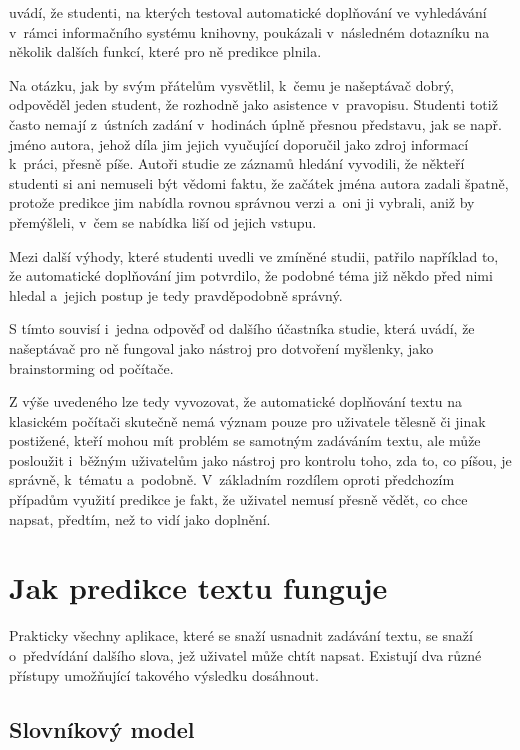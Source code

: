 \documentclass[a4paper,11pt,openany]{book} %
\begin{document}
\parencite{ward2012autocomplete} uvádí, že studenti, na kterých testoval automatické doplňování ve vyhledávání v~rámci informačního systému knihovny, poukázali v~následném dotazníku na několik dalších funkcí, které pro ně predikce plnila.

Na otázku, jak by svým přátelům vysvětlil, k~čemu je našeptávač dobrý, odpověděl jeden student, že rozhodně jako asistence v~pravopisu. Studenti totiž často nemají z~ústních zadání v~hodinách úplně přesnou představu, jak se např. jméno autora, jehož díla jim jejich vyučující doporučil jako zdroj informací k~práci, přesně píše. Autoři studie ze záznamů hledání vyvodili, že někteří studenti si ani nemuseli být vědomi faktu, že začátek jména autora zadali špatně, protože predikce jim nabídla rovnou správnou verzi a~oni ji vybrali, aniž by přemýšleli, v~čem se nabídka liší od jejich vstupu. 

Mezi další výhody, které studenti uvedli ve zmíněné studii, patřilo například to, že automatické doplňování jim potvrdilo, že podobné téma již někdo před nimi hledal a~jejich postup je tedy pravděpodobně správný. 

S tímto souvisí i~jedna odpověď od dalšího účastníka studie, která uvádí, že našeptávač pro ně fungoval jako nástroj pro dotvoření myšlenky, jako brainstorming od počítače. 

Z výše uvedeného lze tedy vyvozovat, že automatické doplňování textu na klasickém počítači skutečně nemá význam pouze pro uživatele tělesně či jinak postižené, kteří mohou mít problém se samotným zadáváním textu, ale může posloužit i~běžným uživatelům jako nástroj pro kontrolu toho, zda to, co píšou, je správně, k~tématu a~podobně. V~základním rozdílem oproti předchozím případům využití predikce je fakt, že uživatel nemusí přesně vědět, co chce napsat, předtím, než to vidí jako doplnění.

\chapter{Jak predikce textu funguje}

Prakticky všechny aplikace, které se snaží usnadnit zadávání textu, se snaží o~předvídání dalšího slova, jež uživatel může chtít napsat. Existují dva různé přístupy umožňující takového výsledku dosáhnout.

\section{Slovníkový model}
\end{document}
